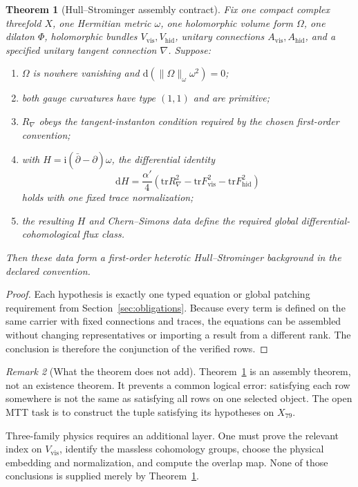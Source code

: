 \documentclass[11pt]{article}
\newcommand{\ii}{\mathrm{i}}
\newcommand{\dd}{\mathrm{d}}
\newcommand{\tr}{\mathrm{tr}}
\newtheorem{theorem}{Theorem}[section]
\theoremstyle{definition}
\theoremstyle{remark}
\newtheorem{remark}[theorem]{Remark}
\begin{document}
\begin{theorem}[Hull--Strominger assembly contract]
\label{thm:contract}
Fix one compact complex threefold \(X\), one Hermitian metric \(\omega\), one
holomorphic volume form \(\Omega\), one dilaton \(\Phi\), holomorphic bundles
\(V_{\mathrm{vis}},V_{\mathrm{hid}}\), unitary connections
\(A_{\mathrm{vis}},A_{\mathrm{hid}}\), and a specified unitary tangent
connection \(\nabla\).  Suppose:
\begin{enumerate}[label=\textup{(\roman*)},leftmargin=2.1em]
\item \(\Omega\) is nowhere vanishing and
      \(\dd(\|\Omega\|_\omega\omega^2)=0\);
\item both gauge curvatures have type \((1,1)\) and are primitive;
\item \(R_\nabla\) obeys the tangent-instanton condition required by the chosen
      first-order convention;
\item with \(H=\ii(\bar\partial-\partial)\omega\), the differential identity
\[
\dd H=\frac{\alpha'}4\left(
\tr R_\nabla^2-\tr F_{\mathrm{vis}}^2-\tr F_{\mathrm{hid}}^2\right)
\]
holds with one fixed trace normalization;
\item the resulting \(H\) and Chern--Simons data define the required global
      differential-cohomological flux class.
\end{enumerate}
Then these data form a first-order heterotic Hull--Strominger background in
the declared convention.
\end{theorem}

\begin{proof}
Each hypothesis is exactly one typed equation or global patching requirement
from Section~\ref{sec:obligations}.  Because every term is defined on the same
carrier with fixed connections and traces, the equations can be assembled
without changing representatives or importing a result from a different
rank.  The conclusion is therefore the conjunction of the verified rows.
\end{proof}

\begin{remark}[What the theorem does not add]
Theorem~\ref{thm:contract} is an assembly theorem, not an existence theorem.
It prevents a common logical error: satisfying each row somewhere is not the
same as satisfying all rows on one selected object.  The open MTT task is to
construct the tuple satisfying its hypotheses on \(X_{79}\).
\end{remark}

Three-family physics requires an additional layer.  One must prove the relevant
index on \(V_{\mathrm{vis}}\), identify the massless cohomology groups, choose
the physical embedding and normalization, and compute the overlap map.  None
of those conclusions is supplied merely by Theorem~\ref{thm:contract}.
\end{document}
